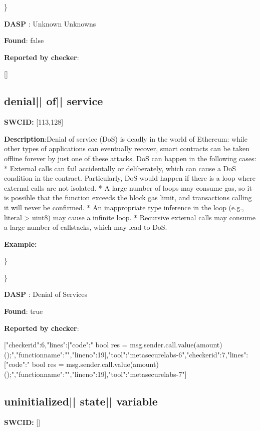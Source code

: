\documentclass{article}
\begin{document}
\} 

\textbf{DASP} : Unknown Unknowns

\textbf{Found}: false

\textbf{Reported by checker}: 
\begin{ffcode} 

[]
\end{ffcode} 
\subsection{denial{|\textunderscore| }of{|\textunderscore| }service} 
\textbf{SWC{\textunderscore }ID:} [113,128]

\textbf{Description}:Denial of service (DoS) is deadly in the world of Ethereum: while other types of applications can eventually recover, smart contracts can be taken offline forever by just one of these attacks. DoS can happen in the following cases:
* External calls can fail accidentally or deliberately, which can cause a DoS condition in the contract. Particularly, DoS would happen if there is a loop where external calls are not isolated.
* A large number of loops may consume gas, so it is possible that the function exceeds the block gas limit, and transactions calling it will never be confirmed.
* An inappropriate type inference in the loop (e.g., literal {\textendash}> uint8) may cause a infinite loop.
* Recursive external calls may consume a large number of callstacks, which may lead to DoS.


\textbf{Example:} 
\begin{ffcode} 

for (var i = 0; i < array.length; i++) { /* ... */

\end{ffcode} 
\} 

\} 

\textbf{DASP} : Denial of Services

\textbf{Found}: true

\textbf{Reported by checker}: 
\begin{ffcode} 

[{"checker\textunderscore id":6,"lines":[{"code":"      bool res = msg.sender.call.value(amount)();\n","function\textunderscore name":"","line\textunderscore no":19}],"tool":"metasecurelabs-6"},{"checker\textunderscore id":7,"lines":[{"code":"      bool res = msg.sender.call.value(amount)();\n","function\textunderscore name":"","line\textunderscore no":19}],"tool":"metasecurelabs-7"}]
\end{ffcode} 
\subsection{uninitialized{|\textunderscore| }state{|\textunderscore| }variable} 
\textbf{SWC{\textunderscore }ID:} []
\end{document}
